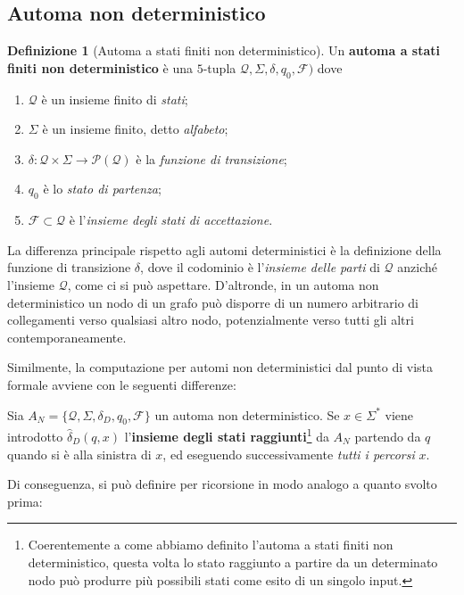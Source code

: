 \documentclass[10pt]{\classname}
\theoremstyle{definition}
\newtheorem{definizione}{Definizione}[section]
\theoremstyle{definition}
\begin{document}
\clearpage

\subsection{Automa non deterministico}

\begin{definizione}[Automa a stati finiti non deterministico]
Un \textbf{automa a stati finiti non deterministico} è una $5$-tupla $\mathcal Q, \Sigma, \delta, q_0,
\mathcal F)$ dove 
\begin{enumerate}
    \item $\mathcal Q$ è un insieme finito di \emph{stati};
    \item $\Sigma$ è un insieme finito, detto \emph{alfabeto};
    \item $\delta : \mathcal Q \times \Sigma \rightarrow \mathcal P(\mathcal Q)$ è la
        \emph{funzione di transizione};
    \item $q_0$ è lo \emph{stato di partenza};
    \item $\mathcal F \subset \mathcal Q$ è l'\emph{insieme degli stati
        di accettazione}.
\end{enumerate}
\end{definizione}

La differenza principale rispetto agli automi deterministici è la definizione
della funzione di transizione $\delta$, dove il codominio è l'\emph{insieme
delle parti} di $\mathcal Q$ anziché l'insieme $\mathcal Q$, come ci si può
aspettare. D'altronde, in un automa non deterministico un nodo di un grafo può disporre di
un numero arbitrario di collegamenti verso qualsiasi altro nodo, potenzialmente
verso tutti gli altri contemporaneamente.

Similmente, la computazione per automi non deterministici dal punto di vista
formale avviene con le seguenti differenze:

Sia $A_N = \{ \mathcal Q, \Sigma, \delta_D, q_0, \mathcal F\}$ un automa non
deterministico. Se $x\in \Sigma^*$ viene introdotto $\hat{\delta}_D (q, x)$
l'\textbf{insieme degli stati raggiunti}\footnote{Coerentemente a come abbiamo
definito l'automa a stati finiti non deterministico, questa volta lo stato
raggiunto a partire da un determinato nodo può produrre più possibili stati
come esito di un singolo input.} da $A_N$ partendo da $q$ quando si è alla
sinistra di $x$, ed eseguendo successivamente \emph{tutti i percorsi} $x$.

Di conseguenza, si può definire per ricorsione in modo analogo a quanto svolto prima:
\end{document}
